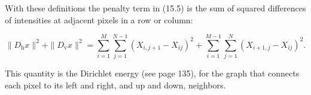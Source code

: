 With these definitions the penalty term in (15.5) is the sum of squared differences of intensities at adjacent pixels in a row or column:

\[\|D_{\mathrm{h}}x\|^{2}+\|D_{\mathrm{v}}x\|^{2}=\sum_{i=1}^{M}\sum_{j=1}^{N-1}(X _{i,j+1}-X_{ij})^{2}+\sum_{i=1}^{M-1}\sum_{j=1}^{N}(X_{i+1,j}-X_{ij})^{2}.\]

This quantity is the Dirichlet energy (see page 135), for the graph that connects each pixel to its left and right, and up and down, neighbors.

 